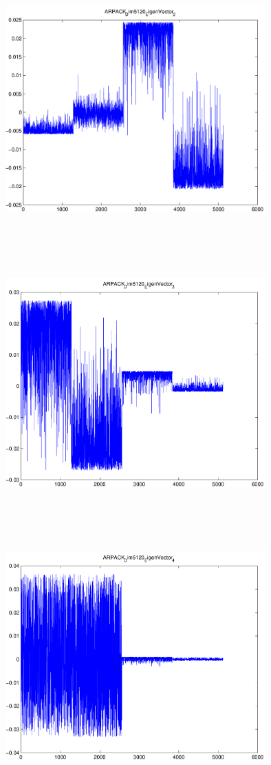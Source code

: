 \documentclass[9pt]{article}
\theoremstyle{plain}
\theoremstyle{definition}
\theoremstyle{remark}
\numberwithin{equation}{section}
\begin{document}
\includegraphics[width=10.0cm,height=10.0cm]{ARPACK_Dim5120_EigenVector_2.pdf}

\includegraphics[width=10.0cm,height=10.0cm]{ARPACK_Dim5120_EigenVector_3.pdf}

\includegraphics[width=10.0cm,height=10.0cm]{ARPACK_Dim5120_EigenVector_4.pdf}
\end{document}
